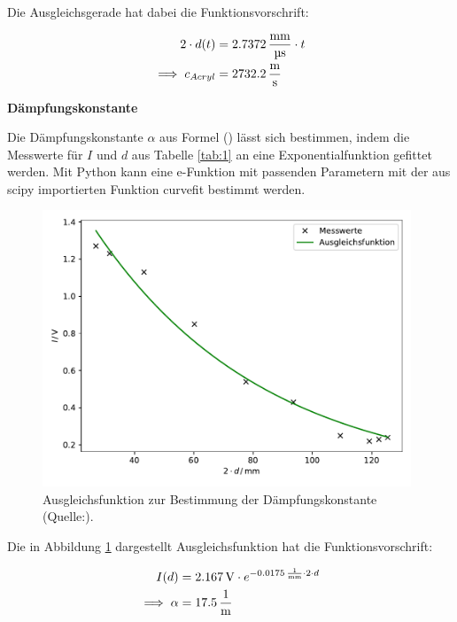 \noindent
Die Ausgleichsgerade hat dabei die Funktionsvorschrift:

\begin{align*}
2 \cdot d(t) &= 2.7372 \, \si[per-mode=fraction]{\milli\meter\per\micro\second} \cdot t \\
\implies c_{Acryl} &= 2732.2 \, \si[per-mode=fraction]{\meter\per\second} \\
\end{align*}

\noindent
\textbf{Dämpfungskonstante}

\noindent
Die Dämpfungskonstante $\alpha$ aus Formel () lässt sich bestimmen, indem die Messwerte für $I$ und $d$ aus Tabelle \ref{tab:1} an eine Exponentialfunktion gefittet werden. %
Mit Python kann eine e-Funktion mit passenden Parametern mit der aus scipy \cite{scipy} importierten Funktion curvefit bestimmt werden.

\begin{figure}
    \centering
    \includegraphics[width=11cm]{Daten/daempf.pdf}
    \caption{Ausgleichsfunktion zur Bestimmung der Dämpfungskonstante (Quelle:\cite{US1}).}
    \label{fig:daempf}
  \end{figure}

  \newpage
\noindent
Die in Abbildung \ref{fig:daempf} dargestellt Ausgleichsfunktion hat die Funktionsvorschrift:

\begin{align*}
I(d) &= 2.167 \, \si{\volt} \cdot e^{-0.0175 \, \si[per-mode=fraction]{\per\milli\meter} \cdot 2 \cdot d}\\
\implies \alpha &= 17.5 \, \si[per-mode=fraction]{\per\meter}\\
\end{align*}



